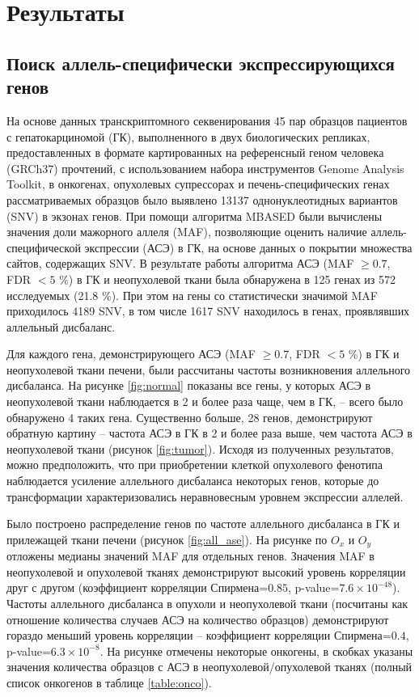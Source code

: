 \section{Результаты}

\subsection{Поиск аллель-специфически экспрессирующихся генов}

На основе данных транскриптомного секвенирования 45 пар образцов пациентов с гепатокарциномой (ГК), выполненного в двух биологических репликах, предоставленных в формате картированных на референсный геном человека (GRCh37) прочтений, с использованием набора инструментов Genome Analysis Toolkit, в онкогенах, опухолевых супрессорах и печень-специфических генах рассматриваемых образцов было выявлено 13137 однонуклеотидных вариантов (SNV) в экзонах генов. При помощи алгоритма MBASED \cite{mayba_mbased:_2014} были вычислены значения доли мажорного аллеля (MAF), позволяющие оценить наличие аллель-специфической экспрессии (АСЭ) в ГК, на основе данных о покрытии множества сайтов, содержащих SNV. В результате работы алгоритма АСЭ (MAF $\geq 0.7$, FDR $< 5$ \%) в ГК и неопухолевой ткани была обнаружена в 125 генах из 572 исследуемых (21.8 \%). При этом на гены со статистически значимой MAF приходилось 4189 SNV, в том числе 1617 SNV находилось в генах, проявлявших аллельный дисбаланс.

Для каждого гена, демонстрирующего АСЭ (MAF $\geq 0.7$, FDR $< 5$ \%) в ГК и неопухолевой ткани печени, были рассчитаны частоты возникновения аллельного дисбаланса. На рисунке \ref{fig:normal} показаны все гены, у которых АСЭ в неопухолевой ткани наблюдается в 2 и более раза чаще, чем в ГК, – всего было обнаружено 4 таких гена. Существенно больше, 28 генов, демонстрируют обратную картину – частота АСЭ в ГК в 2 и более раза выше, чем частота АСЭ в неопухолевой ткани (рисунок \ref{fig:tumor}). Исходя из полученных результатов, можно предположить, что при приобретении клеткой опухолевого фенотипа наблюдается усиление аллельного дисбаланса некоторых генов, которые до трансформации характеризовались неравновесным уровнем экспрессии аллелей. 

Было построено распределение генов по частоте аллельного дисбаланса в ГК и прилежащей ткани печени (рисунок \ref{fig:all_ase}). На рисунке по $O_x$ и $O_y$ отложены медианы значений MAF для отдельных генов. Значения MAF в неопухолевой и опухолевой тканях демонстрируют высокий уровень корреляции друг с другом (коэффициент корреляции Спирмена=$0.85$, p-value=$7.6\times10^{-48}$). Частоты аллельного дисбаланса в опухоли и неопухолевой ткани (посчитаны как отношение количества случаев АСЭ на количество образцов) демонстрируют гораздо меньший уровень корреляции – коэффициент корреляции Спирмена=$0.4$, p-value=$6.3\times10^{-8}$. На рисунке отмечены некоторые онкогены, в скобках указаны значения количества образцов с АСЭ в неопухолевой/опухолевой тканях (полный список онкогенов в таблице \ref{table:onco}).

